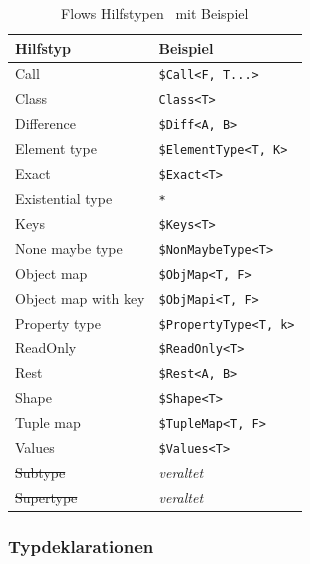 \begin{table}[tbp]
  \footnotesize
  \begin{tabularx}{\textwidth}{@{}ll@{}}
    \midrule
    \textbf{Hilfstyp}   & \textbf{Beispiel}               \\
    \midrule
    Call                & \texttt{\$Call<F, T...>}        \\
    Class               & \texttt{Class<T>}               \\
    Difference          & \texttt{\$Diff<A, B>}           \\
    Element type        & \texttt{\$ElementType<T, K>}    \\
    Exact               & \texttt{\$Exact<T>}             \\
    Existential type    & \texttt{*}                      \\
    Keys                & \texttt{\$Keys<T>}              \\
    None maybe type     & \texttt{\$NonMaybeType<T>}      \\
    Object map          & \texttt{\$ObjMap<T, F>}         \\
    Object map with key & \texttt{\$ObjMapi<T, F>}        \\
    Property type       & \texttt{\$PropertyType<T, k>}   \\
    ReadOnly            & \texttt{\$ReadOnly<T>}          \\
    Rest                & \texttt{\$Rest<A, B>}           \\
    Shape               & \texttt{\$Shape<T>}             \\
    Tuple map           & \texttt{\$TupleMap<T, F>}       \\
    Values              & \texttt{\$Values<T>}            \\
    \sout{Subtype}      & \textit{veraltet}               \\
    \sout{Supertype}    & \textit{veraltet}               \\
    \midrule
  \end{tabularx}
  \caption{Flows Hilfstypen~\autocite{FLOW_UTILITY_TYPES} mit Beispiel}
  \label{tab:flow-utility-types}
\end{table}

\subsubsection{Typdeklarationen}

